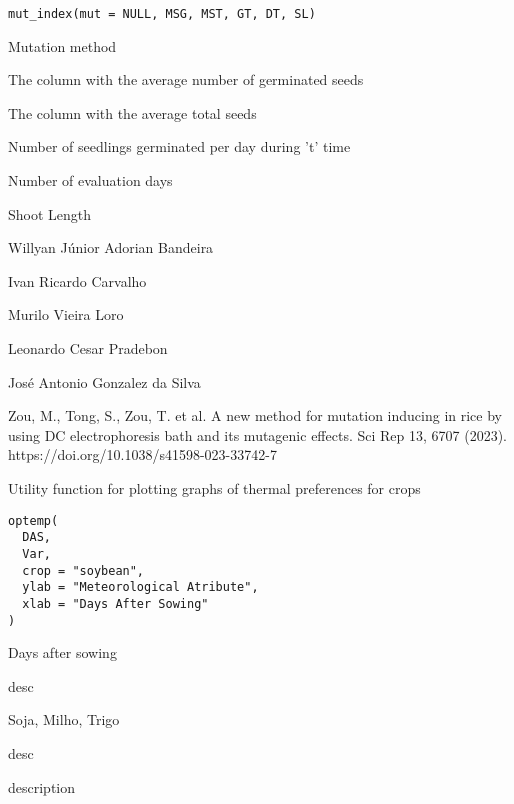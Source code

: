 \documentclass[a4paper]{book}
\begin{document}
%
\begin{Usage}
\begin{verbatim}
mut_index(mut = NULL, MSG, MST, GT, DT, SL)
\end{verbatim}
\end{Usage}
%
\begin{Arguments}
\begin{ldescription}
\item[\code{mut}] Mutation method

\item[\code{MSG}] The column with the average number of germinated seeds

\item[\code{MST}] The column with the average total seeds

\item[\code{GT}] Number of seedlings germinated per day during 't' time

\item[\code{DT}] Number of evaluation days

\item[\code{SL}] Shoot Length
\end{ldescription}
\end{Arguments}
%
\begin{Author}
Willyan Júnior Adorian Bandeira

Ivan Ricardo Carvalho

Murilo Vieira Loro

Leonardo Cesar Pradebon

José Antonio Gonzalez da Silva
\end{Author}
%
\begin{References}
Zou, M., Tong, S., Zou, T. et al. A new method for mutation inducing in rice
by using DC electrophoresis bath and its mutagenic effects. Sci Rep 13, 6707
(2023). https://doi.org/10.1038/s41598-023-33742-7
\end{References}
%
\begin{Description}
Utility function for plotting graphs of thermal preferences for crops
\end{Description}
%
\begin{Usage}
\begin{verbatim}
optemp(
  DAS,
  Var,
  crop = "soybean",
  ylab = "Meteorological Atribute",
  xlab = "Days After Sowing"
)
\end{verbatim}
\end{Usage}
%
\begin{Arguments}
\begin{ldescription}
\item[\code{DAS}] Days after sowing

\item[\code{Var}] desc

\item[\code{crop}] Soja, Milho, Trigo

\item[\code{ylab}] desc

\item[\code{xlab}] description
\end{ldescription}
\end{Arguments}
\end{document}
